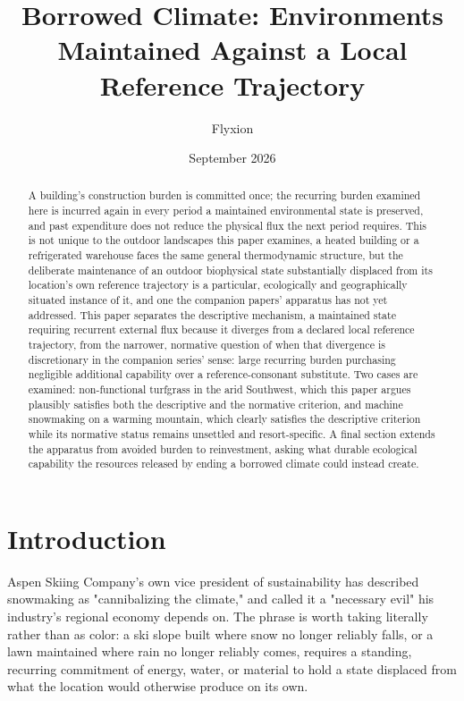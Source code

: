 \documentclass[11pt]{article}
\title{Borrowed Climate: Environments Maintained Against a Local Reference Trajectory}
\author{Flyxion}
\affil{Independent Researcher}
\date{September 2026}
\begin{document}
\maketitle

\begin{abstract}
A building's construction burden is committed once; the recurring burden examined here is incurred again in every period a maintained environmental state is preserved, and past expenditure does not reduce the physical flux the next period requires. This is not unique to the outdoor landscapes this paper examines, a heated building or a refrigerated warehouse faces the same general thermodynamic structure, but the deliberate maintenance of an outdoor biophysical state substantially displaced from its location's own reference trajectory is a particular, ecologically and geographically situated instance of it, and one the companion papers' apparatus has not yet addressed. This paper separates the descriptive mechanism, a maintained state requiring recurrent external flux because it diverges from a declared local reference trajectory, from the narrower, normative question of when that divergence is discretionary in the companion series' sense: large recurring burden purchasing negligible additional capability over a reference-consonant substitute. Two cases are examined: non-functional turfgrass in the arid Southwest, which this paper argues plausibly satisfies both the descriptive and the normative criterion, and machine snowmaking on a warming mountain, which clearly satisfies the descriptive criterion while its normative status remains unsettled and resort-specific. A final section extends the apparatus from avoided burden to reinvestment, asking what durable ecological capability the resources released by ending a borrowed climate could instead create.
\end{abstract}

\section{Introduction}

Aspen Skiing Company's own vice president of sustainability has described snowmaking as "cannibalizing the climate," and called it a "necessary evil" his industry's regional economy depends on. The phrase is worth taking literally rather than as color: a ski slope built where snow no longer reliably falls, or a lawn maintained where rain no longer reliably comes, requires a standing, recurring commitment of energy, water, or material to hold a state displaced from what the location would otherwise produce on its own.
\end{document}
